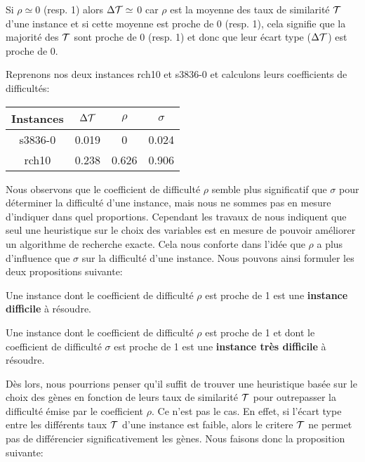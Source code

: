 \begin{remarque}
	Si $\rho \simeq 0$ (resp. 1) alors $\Delta\cal{T} \simeq $ 0 car $\rho$ est la moyenne des taux de similarité $\cal{T}$ d'une instance et si cette moyenne est proche de 0 (resp. 1), cela signifie que la majorité des $\cal{T}$ sont proche de 0 (resp. 1) et donc que leur écart type ($\Delta\cal{T}$) est proche de 0.
	\label{remDeltaTau}
\end{remarque}


Reprenons nos deux instances rch10 et s3836-0 et calculons leurs coefficients de difficultés:

\begin{center}
\begin{tabular}{|c|c|c|c|}
\hline 
Instances & $\Delta\cal{T} $ & $\rho$ & $\sigma$ \\ 
\hline 
s3836-0 & 0.019 & 0 & 0.024 \\ 
\hline
rch10 & 0.238 & 0.626 & 0.906 \\ 
\hline
\end{tabular} 
\end{center}

Nous observons que le coefficient de difficulté $\rho$ semble plus significatif que $\sigma$ pour déterminer la difficulté d'une instance, mais nous ne sommes pas en mesure d'indiquer dans quel proportions. Cependant les travaux de \cite{Chhel2013} nous indiquent que seul une heuristique sur le choix des variables est en mesure de pouvoir améliorer un algorithme de recherche exacte. Cela nous conforte dans l'idée que $\rho$ a plus d'influence que $\sigma$ sur la difficulté d'une instance. Nous pouvons ainsi formuler les deux propositions suivante:

\begin{proposition}
Une instance dont le coefficient de difficulté $\rho$ est proche de 1 est une \textbf{instance difficile} à résoudre.
\end{proposition}

\begin{proposition}
Une instance dont le coefficient de difficulté $\rho$ est proche de 1 et dont le coefficient de difficulté $\sigma$ est proche de 1 est une \textbf{instance très difficile} à résoudre.
\end{proposition}

Dès lors, nous pourrions penser qu'il suffit de trouver une heuristique basée sur le choix des gènes en fonction de leurs taux de similarité $\cal{T}$ pour outrepasser la difficulté émise par le coefficient $\rho$. Ce n'est pas le cas. En effet, si l'écart type entre les différents taux $\cal{T}$ d'une instance est faible, alors le critere $\cal{T}$ ne permet pas de différencier significativement les gènes. Nous faisons donc la proposition suivante: 

